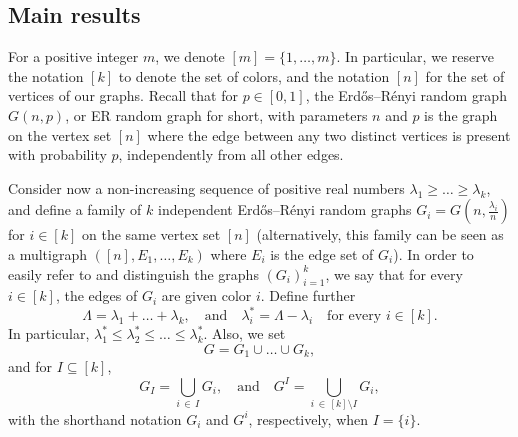 \documentclass[10pt]{amsart}
\theoremstyle{definition}\newtheorem{defi}[theo]{Definition}\newtheorem{rema}[theo]{Remark}\newtheorem{exam}[theo]{Example}\newtheorem{exem}[theo]{Example}\newtheorem{nota}[theo]{Notation}
\begin{document}
\subsection{Main results}

For a positive integer $m$, we denote $[m] = \{1,\ldots,m\}$. In particular, we reserve the notation $[k]$ to denote the set of colors, and the notation $[n]$ for the set of vertices of our graphs. Recall that for $p\in [0,1]$, the Erd\H{o}s--Rényi random graph $G(n,p)$, or ER random graph for short, with parameters $n$ and $p$ is the graph on the vertex set $[n]$ where the edge between any two distinct vertices is present with probability $p$, independently from all other edges.

Consider now a non-increasing sequence of positive real numbers $\lambda_1\ge \dots \ge \lambda_k$, and define a family of $k$ independent Erd\H{o}s--Rényi random graphs $G_i= G(n,\tfrac{\lambda_i}{n})$ for $i\in [k]$ on the same vertex set $[n]$ (alternatively, this family can be seen as a multigraph $([n],E_1,\dots,E_k)$ where $E_i$ is the edge set of $G_i$). In order to easily refer to and distinguish the graphs $(G_i)_{i=1}^k$, we say that for every $i\in [k]$, the edges of $G_i$ are given color $i$. Define further
\[
\Lambda = \lambda_1 + \dots +\lambda_k,\quad \text{and}\quad
\lambda_i^* = \Lambda - \lambda_i \quad \text{for every }i\in[k].
\]
In particular, $\lambda_1^* \le \lambda_2^*\le \dots \le \lambda_k^*$. Also, we set
\begin{equation}\label{eq:defG}
G = G_1\cup \ldots\cup G_k,
\end{equation}
and for $I\subseteq [k]$,
\[
G_I= \bigcup_{i\,\in\,I} G_i, \quad \text{and}\quad G^I = \bigcup_{i\,\in\,[k]\setminus I} G_i,
\]
with the shorthand notation $G_i$ and $G^i$, respectively, when $I=\{i\}$.
\end{document}
